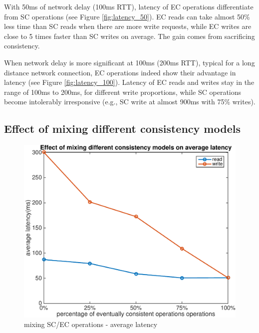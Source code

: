 With 50ms of network delay (100ms RTT), latency of EC operations differentiate from SC operations  (see Figure \ref{fig:latency_50}). EC reads can take almost 50\% less time than SC reads when there are more write requests, while EC writes are close to 5 times faster than SC writes on average. The gain comes from sacrificing consistency.

When network delay is more significant at 100ms (200ms RTT), typical for a long distance network connection, EC operations indeed show their advantage in latency  (see Figure \ref{fig:latency_100}). Latency of EC reads and writes stay in the range of 100ms to 200ms, for different write proportions, while SC operations become intolerably irresponsive (e.g., SC write at almost 900ms with 75\% writes).

\subsection{Effect of mixing different consistency models}
\vspace{-2mm}
\begin{figure}[hbt]
\centering
\includegraphics[width=\linewidth]{figures/mix.pdf}
\caption{mixing SC/EC operations - average latency}
\label{fig:mix}
\end{figure}
\vspace{-5mm}

